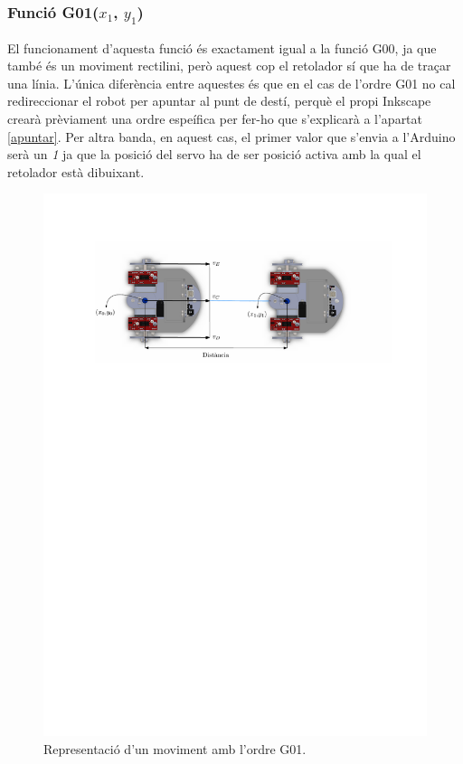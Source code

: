 \subsubsection{Funció G01($x_{1}$, $y_{1}$)}
El funcionament d’aquesta funció és exactament igual a la funció G00, ja que també és un moviment rectilini, però aquest cop el retolador sí que ha de traçar una línia. L'única diferència entre aquestes és que en el cas de l’ordre G01 no cal redireccionar el robot per apuntar al punt de destí, perquè el propi Inkscape crearà prèviament una ordre espeífica per fer-ho que s’explicarà a l’apartat \ref{apuntar}. Per altra banda, en aquest cas, el primer valor que s’envia a l’Arduino serà un \emph{1} ja que la posició del servo ha de ser posició activa amb la qual el retolador està dibuixant. 

\begin{figure}[H]
	\centering
	\includegraphics[scale=0.9]{G01}
	\caption{Representació d'un moviment amb l'ordre G01.}
	\label{fig:G01}
\end{figure}

